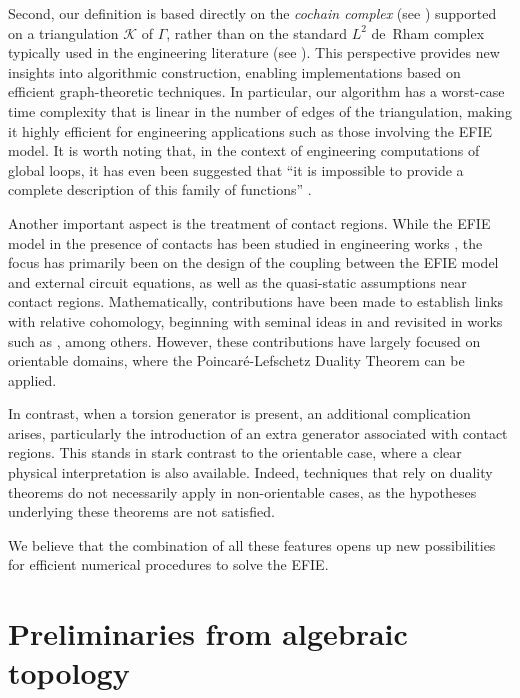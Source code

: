 \documentclass[a4paper,twoside,10pt]{article}
\theoremstyle{plain}
\theoremstyle{definition}
\theoremstyle{remark}
\begin{document}
Second, our definition is based directly on the \emph{cochain complex} (see \cite[Section 2.6]{arnold2018finite}) supported on a triangulation $\mathcal K$ of $\Gamma$, rather than on the standard $L^2$ de~Rham complex typically used in the engineering literature (see \cite[Section IV]{adrian2021electromagnetic}).
This perspective provides new insights into algorithmic construction, enabling implementations based on efficient graph-theoretic techniques.
In particular, our algorithm has a worst-case time complexity that is linear in the number of edges of the triangulation, making it highly efficient for engineering applications such as those involving the EFIE model.
It is worth noting that, in the context of engineering computations of global loops, it has even been suggested that ``it is impossible to provide a complete description of this family of functions'' \cite{andriulli2012well}.

Another important aspect is the treatment of contact regions. While the EFIE model in the presence of contacts has been studied in engineering works \cite{miano2005surface, wang2004generalized}, the focus has primarily been on the design of the coupling between the EFIE model and external circuit equations, as well as the quasi-static assumptions near contact regions.
Mathematically, contributions have been made to establish links with relative cohomology, beginning with seminal ideas in \cite{gross2004electromagnetic} and revisited in works such as \cite{suuriniemi2004state, suuriniemi2007driving, hiptmair2021electromagnetic}, among others.
However, these contributions have largely focused on orientable domains, where the Poincar\'e-Lefschetz Duality Theorem can be applied.

In contrast, when a torsion generator is present, an additional complication arises, particularly the introduction of an extra generator associated with contact regions.
This stands in stark contrast to the orientable case, where a clear physical interpretation is also available.
Indeed, techniques that rely on duality theorems do not necessarily apply in non-orientable cases, as the hypotheses underlying these theorems are not satisfied.

We believe that the combination of all these features opens up new possibilities for efficient numerical procedures to solve the EFIE.
\section{Preliminaries from algebraic topology}
\label{sec:math}
\end{document}
